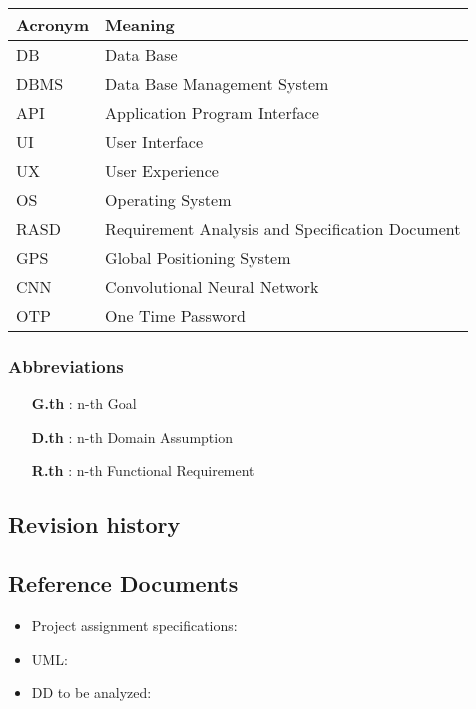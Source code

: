 \begin{tabular}{|l|l|}
\hline
Acronym & Meaning \\ \hline
DB & Data Base \\ \hline
DBMS & Data Base Management System \\ \hline
API & Application Program Interface \\ \hline
UI & User Interface \\ \hline
UX & User Experience \\ \hline
OS & Operating System \\ \hline
RASD & Requirement Analysis and Specification Document \\ \hline
GPS & Global Positioning System \\ \hline
CNN & Convolutional Neural Network \\ \hline
OTP & One Time Password \\ 
\hline


\end{tabular}

\subsubsection{Abbreviations}

\begin{itemize}

\item [\textbf{G.th}]: n-th Goal

\item [\textbf{D.th}]: n-th Domain Assumption

\item [\textbf{R.th}]: n-th Functional Requirement

\end{itemize}


\subsection{Revision history}


\subsection{Reference Documents}

\begin{itemize}

\item Project assignment specifications:\cite{ASSIGNMENT}

\item UML: \cite{UML}

\item DD to be analyzed: \cite{DD}

\end{itemize}


